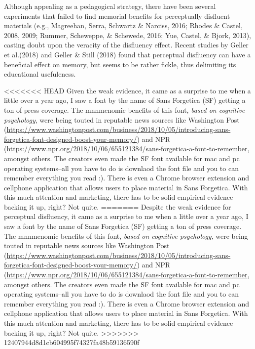 \documentclass[]{article}
\begin{document}
Although appealing as a pedagogical strategy, there have been several
experiments that failed to find memorial benefits for perceptually
disfluent materials (e.g., Magreehan, Serra, Schwartz \& Narciss, 2016;
Rhodes \& Castel, 2008, 2009; Rummer, Scheweppe, \& Schewede, 2016; Yue,
Castel, \& Bjork, 2013), casting doubt upon the veracity of the
disfluency effect. Recent studies by Geller et al.(2018) and Geller \&
Still (2018) found that perceptual disfluency can have a beneficial
effect on memory, but seems to be rather fickle, thus delimiting its
educational usefuleness.

\textless{}\textless{}\textless{}\textless{}\textless{}\textless{}\textless{}
HEAD Given the weak evidence, it came as a surprise to me when a little
over a year ago, I saw a font by the name of Sans Forgetica (SF) getting
a ton of press coverage. The mnnmenomic benefits of this font,
\emph{based on cognitive psychology}, were being touted in reputable
news sources like Washington Post
(\url{https://www.washingtonpost.com/business/2018/10/05/introducing-sans-forgetica-font-designed-boost-your-memory/})
and NPR
(\url{https://www.npr.org/2018/10/06/655121384/sans-forgetica-a-font-to-remember},
amongst others. The creators even made the SF font available for mac and
pc operating systems--all you have to do is downlaod the font file and
you to can remember everything you read :). There is even a Chrome
browser extension and cellphone application that allows users to place
material in Sans Forgetica. With this much attention and marketing,
there has to be solid empirical evidence backing it up, right? Not
quite. ======= Despite the weak evidence for perceptual disfluency, it
came as a surprise to me when a little over a year ago, I saw a font by
the name of Sans Forgetica (SF) getting a ton of press coverage. The
mnnmenomic benefits of this font, \emph{based on cognitive psychology},
were being touted in reputable news sources like Washington Post
(\url{https://www.washingtonpost.com/business/2018/10/05/introducing-sans-forgetica-font-designed-boost-your-memory/})
and NPR
(\url{https://www.npr.org/2018/10/06/655121384/sans-forgetica-a-font-to-remember},
amongst others. The creators even made the SF font available for mac and
pc operating systems--all you have to do is downlaod the font file and
you to can remember everything you read :). There is even a Chrome
browser extension and cellphone application that allows users to place
material in Sans Forgetica. With this much attention and marketing,
there has to be solid empirical evidence backing it up, right? Not
quite.
\textgreater{}\textgreater{}\textgreater{}\textgreater{}\textgreater{}\textgreater{}\textgreater{}
12407944d8d1cb604995f74327fa48b59136590f
\end{document}
